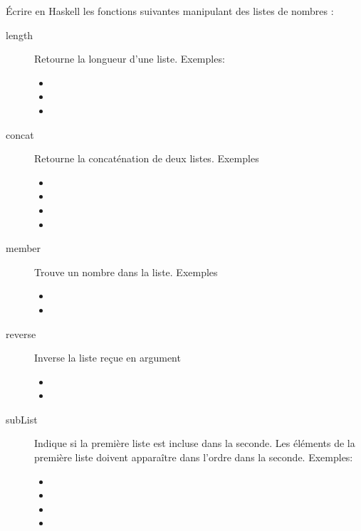 \begin{Exercise}[title={Récursion et liste}]
  \label{ex:recursion_liste}
  Écrire en Haskell les fonctions suivantes manipulant des listes de nombres  :
\begin{description}
\item[length] Retourne la longueur d'une liste. Exemples:
  \begin{itemize}
  \item {}
  \item {}
  \item {}
  \end{itemize}
\item[concat] Retourne la concaténation de deux listes. Exemples 
  \begin{itemize}
  \item {}
  \item {}
  \item {}
  \item {}
  \end{itemize}
\item[member] Trouve un nombre dans la liste. Exemples 
  \begin{itemize}
  \item {}
  \item {}
  \end{itemize}
\item[reverse] Inverse la liste reçue en argument 
  \begin{itemize}
  \item {}
  \item {}
  \end{itemize}
\item[subList] Indique si la première liste est incluse dans la
  seconde. Les éléments de la première liste doivent apparaître dans
  l'ordre dans la seconde. Exemples:
  \begin{itemize}
  \item {}
  \item {}
  \item {}
  \item {}
  \end{itemize}
\end{description}
\end{Exercise}

\begin{Answer}[ref={ex:recursion_liste}]
\end{Answer}